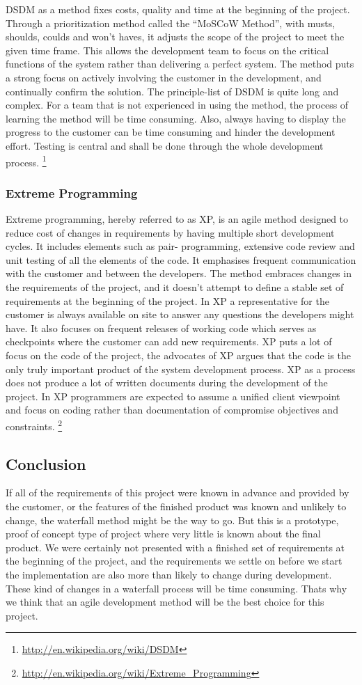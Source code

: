 DSDM as a method fixes costs, quality and time at the beginning of the project. Through a prioritization method called the “MoSCoW Method”, with musts, shoulds, coulds and won’t haves, it adjusts the scope of the project to meet the given time frame. This allows the development team to focus on the critical functions of the system rather than delivering a perfect system. The method puts a strong focus on actively involving the customer in the development, and continually confirm the solution. The principle-list of DSDM is quite long and complex. For a team that is not experienced in using the method, the process of learning the method will be time consuming. Also, always having to display the progress to the customer can be time consuming and hinder the development effort. Testing is central and shall be done through the whole development process.
\footnote{\url{http://en.wikipedia.org/wiki/DSDM}}

\subsubsection{Extreme Programming}
Extreme programming, hereby referred to as XP, is an agile method designed to reduce cost of changes in requirements by having multiple short development cycles. It includes elements such as pair- programming, extensive code review and unit testing of all the elements of the code. It emphasises frequent communication with the customer and between the developers. The method embraces changes in the requirements of the project, and it doesn't attempt to define a stable set of requirements at the beginning of the project. In XP a representative for the customer is always available on site to answer any questions the developers might have. It also focuses on frequent releases of working code which serves as checkpoints where the customer can add new requirements. XP puts a lot of focus on the code of the project, the advocates of XP argues that the code is the only truly important product of the system development process. XP as a process does not produce a lot of written documents during the development of the project. In XP programmers are expected to assume a unified client viewpoint and focus on coding rather than documentation of compromise objectives and constraints.
\footnote{\url{http://en.wikipedia.org/wiki/Extreme_Programming}}

\subsection{Conclusion}
If all of the requirements of this project were known in advance and provided by the customer, or the features of the finished product was known and unlikely to change, the waterfall method might be the way to go. But this is a prototype, proof of concept type of project where very little is known about the final product. We were certainly not presented with a finished set of requirements at the beginning of the project, and the requirements we settle on before we start the implementation are also more than likely to change during development. These kind of changes in a waterfall process will be time consuming. Thats why we think that an agile development method will be the best choice for this project.

